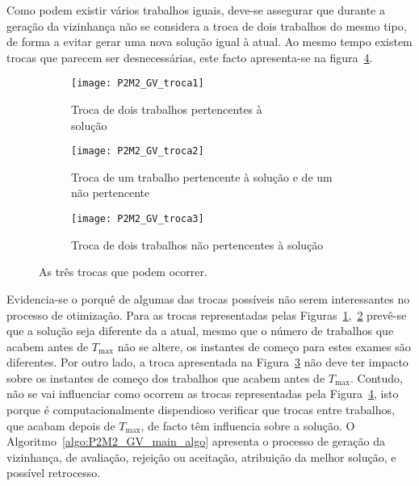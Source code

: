 Como podem existir vários trabalhos iguais, deve-se assegurar que durante a geração da vizinhança não se considera a troca de dois trabalhos do mesmo tipo, de forma a evitar gerar uma nova solução igual à atual. Ao mesmo tempo existem trocas que parecem ser desnecessárias, este facto apresenta-se na figura~\ref{fig:P2M2_GV_troca}.\\
\begin{figure}[H]
	\centering
	\begin{subfigure}{0.49\textwidth}
	\centering
		\texttt{[image: P2M2\_GV\_troca1]}
		\caption{Troca de dois trabalhos pertencentes à \\solução}
		\label{fig:P2M2_GV_troca1}
	\end{subfigure}
	\begin{subfigure}{0.49\textwidth}
	\centering
		\texttt{[image: P2M2\_GV\_troca2]}
		\caption{Troca de um trabalho pertencente à solução e de um não pertencente}
		\label{fig:P2M2_GV_troca2}
	\end{subfigure}
	\begin{subfigure}{0.49\textwidth}
	\centering
		\texttt{[image: P2M2\_GV\_troca3]}
		\caption{Troca de dois trabalhos não pertencentes à solução}
		\label{fig:P2M2_GV_troca3}
	\end{subfigure}
	\caption{As três trocas que podem ocorrer.}
	\label{fig:P2M2_GV_troca}
\end{figure}

Evidencia-se o porquê de algumas das trocas possíveis não serem interessantes no processo de otimização. Para as trocas representadas pelas Figuras~\ref{fig:P2M2_GV_troca1},~\ref{fig:P2M2_GV_troca2} prevê-se que a solução seja diferente da a atual, mesmo que o número de trabalhos que acabem antes de $T_{\max}$ não se altere, os instantes de começo para estes exames são diferentes. Por outro lado, a troca apresentada na Figura~\ref{fig:P2M2_GV_troca3} não deve ter impacto sobre os instantes de começo dos trabalhos que acabem antes de $T_{\max}$. Contudo, não se vai influenciar como ocorrem as trocas representadas pela Figura~\ref{fig:P2M2_GV_troca}, isto porque é computacionalmente dispendioso verificar que trocas entre trabalhos, que acabam depois de $T_{\max}$, de facto têm influencia sobre a solução. O Algoritmo~\ref{algo:P2M2_GV_main_algo} apresenta o processo de geração da vizinhança, de avaliação, rejeição ou aceitação, atribuição da melhor solução, e possível retrocesso.\\


